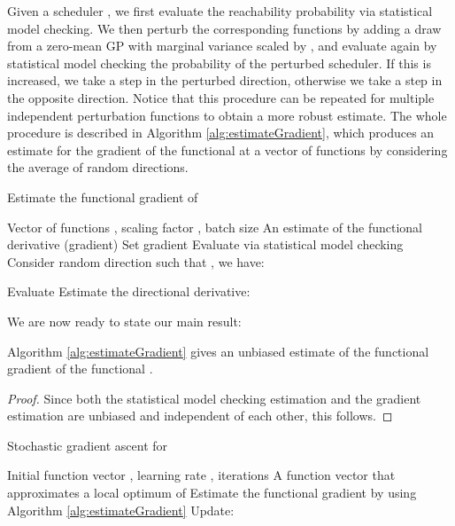 Given a scheduler , we first evaluate the reachability probability via statistical model checking. 
We then perturb the corresponding functions  by adding a draw from a zero-mean GP with marginal variance scaled by , and evaluate again by statistical model checking the probability of the perturbed scheduler. If this is increased, we take a step in the perturbed direction, otherwise we take a step in the opposite direction. Notice that this procedure can be repeated for multiple independent perturbation functions to obtain a more robust estimate. 
The whole procedure is described in Algorithm \ref{alg:estimateGradient}, which produces an estimate for the gradient of the functional  at a vector  of functions  by considering the average of  random directions.
\begin{algorithm}[ht!]
\caption{Estimate the functional gradient of }
\label{alg:estimateGradient}
\begin{algorithmic}
\REQUIRE Vector  of functions , scaling factor , batch size 
\ENSURE An estimate of the functional derivative (gradient) 
	\STATE Set gradient 
	\STATE Evaluate  via statistical model checking
		\STATE Consider random direction  such that , we have:
		
		\STATE Evaluate 
		\STATE Estimate the directional derivative:
		
		\IF{}
			\STATE 
		\ELSE
			\STATE 
		\ENDIF
	\ENDFOR
\end{algorithmic}
\end{algorithm}
We are now ready to state our main result:
\begin{theorem}
Algorithm \ref{alg:estimateGradient} gives an unbiased estimate of the functional gradient of the functional .
\end{theorem}
\begin{proof} Since both the statistical model checking estimation and the gradient estimation are unbiased and independent of each other, this follows.
\end{proof}

\begin{algorithm}[ht!]
\caption{Stochastic gradient ascent for }
\label{alg:gradientAscent}
\begin{algorithmic}
\REQUIRE Initial function vector , learning rate ,  iterations
\ENSURE A function vector  that approximates a local optimum of 
	\FOR { \TO }
		\STATE Estimate the functional gradient  by using Algorithm \ref{alg:estimateGradient}
		\STATE Update: 
	\ENDFOR
\end{algorithmic}
\end{algorithm}


